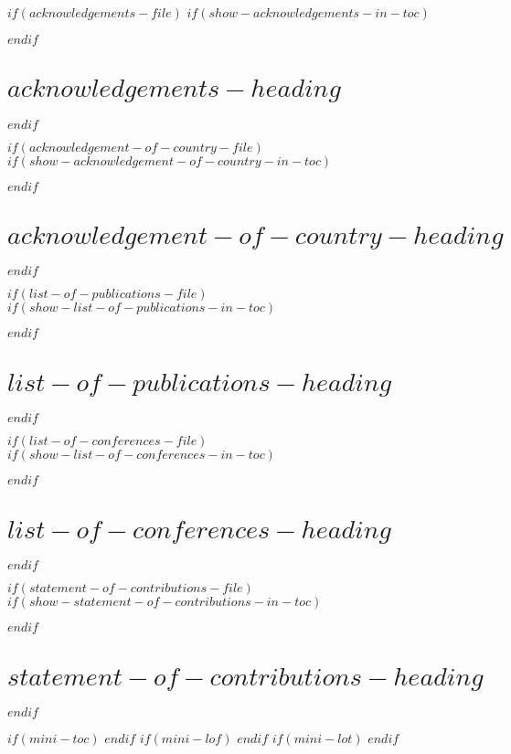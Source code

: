 \documentclass[a4paper, $if(page-layout)$$page-layout$$endif$]{templates/curtinthesis}
\begin{document}
\begin{romanpages}
$if(acknowledgements-file)$
  $if(show-acknowledgements-in-toc)$
  $endif$
  \chapter*{$acknowledgements-heading$}
  
$endif$

$if(acknowledgement-of-country-file)$
  $if(show-acknowledgement-of-country-in-toc)$
  $endif$
  \chapter*{$acknowledgement-of-country-heading$}
  
$endif$

$if(list-of-publications-file)$
  $if(show-list-of-publications-in-toc)$
  $endif$
  \chapter*{$list-of-publications-heading$}
  
$endif$

$if(list-of-conferences-file)$
  $if(show-list-of-conferences-in-toc)$
  $endif$
  \chapter*{$list-of-conferences-heading$}
  
$endif$

$if(statement-of-contributions-file)$
  $if(show-statement-of-contributions-in-toc)$
  $endif$
  \chapter*{$statement-of-contributions-heading$}
  
$endif$



$if(mini-toc)$
  \dominitoc %
$endif$
$if(mini-lof)$
  \dominilof  %
$endif$
$if(mini-lot)$
  \dominilot  %
$endif$


\end{romanpages}
\end{document}
